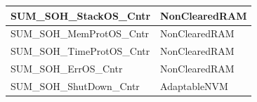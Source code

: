 \begin{longtable}{|l|l|}
\begin{minipage}{0.47\linewidth}\raggedright\vspace{.75ex}SUM\_SOH\_StackOS\_Cntr\vspace{.75ex}\end{minipage} & \begin{minipage}{0.47\linewidth}\raggedright\vspace{.75ex}NonClearedRAM\vspace{.75ex}\end{minipage}\\\hline
\begin{minipage}{0.47\linewidth}\raggedright\vspace{.75ex}SUM\_SOH\_MemProtOS\_Cntr\vspace{.75ex}\end{minipage} & \begin{minipage}{0.47\linewidth}\raggedright\vspace{.75ex}NonClearedRAM\vspace{.75ex}\end{minipage}\\\hline
\begin{minipage}{0.47\linewidth}\raggedright\vspace{.75ex}SUM\_SOH\_TimeProtOS\_Cntr\vspace{.75ex}\end{minipage} & \begin{minipage}{0.47\linewidth}\raggedright\vspace{.75ex}NonClearedRAM\vspace{.75ex}\end{minipage}\\\hline
\begin{minipage}{0.47\linewidth}\raggedright\vspace{.75ex}SUM\_SOH\_ErrOS\_Cntr\vspace{.75ex}\end{minipage} & \begin{minipage}{0.47\linewidth}\raggedright\vspace{.75ex}NonClearedRAM\vspace{.75ex}\end{minipage}\\\hline
\begin{minipage}{0.47\linewidth}\raggedright\vspace{.75ex}SUM\_SOH\_ShutDown\_Cntr\vspace{.75ex}\end{minipage} & \begin{minipage}{0.47\linewidth}\raggedright\vspace{.75ex}AdaptableNVM\vspace{.75ex}\end{minipage}\\\hline

\end{longtable}
